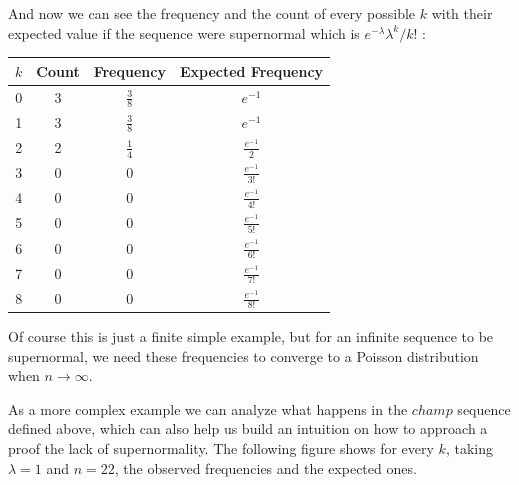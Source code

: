 \documentclass[11pt,a4paper]{tesis}
\begin{document}
And now we can see the frequency and the count of every possible $k$ with their
 expected value if the sequence were supernormal which is ${e^{-\lambda}\lambda^k}/{k!}$ :

\begin{center}
    \begin{tabular}{|c | c |  c| c |} 
    \hline
    $k$ & Count &  Frequency & Expected Frequency \\ [0.1ex] 
    \hline
    0 & 3 & $\frac{3}{8}$ & $e^{-1} $ \\ [0.5ex] 
    \hline
    1 & 3 &$\frac{3}{8}$ & $e^{-1} $ \\  [0.5ex] 
    \hline
    2 & 2 &$\frac{1}{4}$ & $\frac{e^{-1}}{2} $ \\  [0.5ex] 
    \hline
    3 & 0 & 0 & $\frac{e^{-1}}{3!} $ \\  [0.5ex] 
    \hline
    4 & 0 & 0 & $\frac{e^{-1}}{4!} $ \\ [0.5ex] 
    \hline
    5 & 0 & 0 & $\frac{e^{-1}}{5!} $ \\ [0.5ex] 
    \hline
    6 & 0 & 0  & $\frac{e^{-1}}{6!} $ \\ [0.5ex] 
    \hline
    7 & 0 & 0 & $\frac{e^{-1}}{7!} $ \\ [0.5ex] 
    \hline
    8 & 0 & 0 & $\frac{e^{-1}}{8!} $ \\  [0.5ex] 
    \hline
   \end{tabular}
\end{center}

Of course this is just a finite simple example, but for an infinite sequence to be supernormal, we need these frequencies to converge to a Poisson distribution when $n \rightarrow \infty$. 

As a more complex example we can analyze what happens in the $champ$ sequence defined above, which can 
also help us build an intuition on how to approach a proof the lack of supernormality.
The following figure shows for every $k$, taking $\lambda = 1$ and $n = 22$, the observed frequencies and the expected ones.

\end{document}
